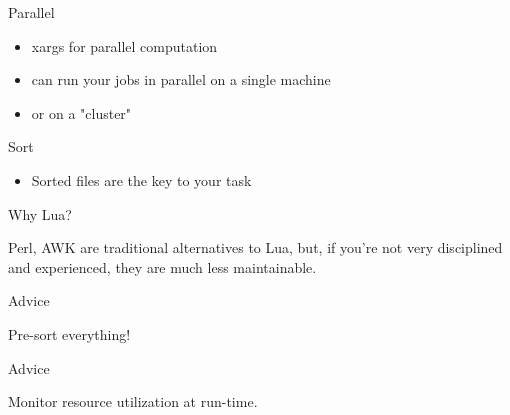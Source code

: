 \documentclass[handout]{beamer}
\begin{document}

\begin{frame}{Parallel}

\begin{itemize}
\item xargs for parallel computation
\item can run your jobs in parallel on a single machine
\item or on a "cluster"
\end{itemize}

\end{frame}


\begin{frame}{Sort}

\begin{itemize}
\item Sorted files are the key to your task
\end{itemize}

\end{frame}


\begin{frame}{Why Lua?}

Perl, AWK are traditional alternatives to Lua,
but, if you're not very disciplined and experienced,
they are much less maintainable.

\end{frame}


\begin{frame}{Advice}

\Large Pre-sort everything!

\end{frame}


\begin{frame}{Advice}

\Large Monitor resource utilization at run-time.

\end{frame}

\end{document}
